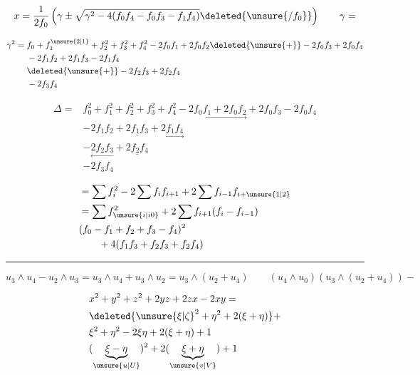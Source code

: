 \[
x=\frac{1}{2f_0}\left(\gamma\pm\sqrt{\gamma^2-4(f_0f_4-f_0f_3-f_1f_4)}\deleted{\unsure{/f_0}}\right)
\qquad \gamma=
\]

\[
\begin{aligned}
\gamma^2={}&f_0+f_1^{\unsure{2|1}}+f_2^2+f_3^2+f_4^2-2f_0f_1+2f_0f_2
\deleted{\unsure{+}}-2f_0f_3+2f_0f_4\\
&-2f_1f_2+2f_1f_3-2f_1f_4\\
&\deleted{\unsure{+}}-2f_2f_3+2f_2f_4\\
&-2f_3f_4
\end{aligned}
\]

\[
\begin{aligned}
\Delta={}&f_0^2+f_1^2+f_2^2+f_3^2+f_4^2-\underset{\longrightarrow}{\boxed{2f_0f_1}+\boxed{2f_0f_2}}+\boxed{2f_0f_3}-\boxed{2f_0f_4}\\
&-\boxed{2f_1f_2}+\underline{\boxed{2f_1f_3}}+2\underset{\longrightarrow}{\boxed{f_1f_4}}\\
&-\underset{\longleftarrow}{\boxed{2f_2f_3}}+\underline{\boxed{2f_2f_4}}\\
&-\boxed{2f_3f_4}
\end{aligned}
\]

\[
\begin{aligned}
&=\sum f_i^2-2\sum f_i f_{i+1}+2\sum f_{i-1}f_{i+\unsure{1|2}}\\
&=\sum f_{\unsure{i|i0}}^2+2\sum f_{i+1}(f_i-f_{i-1})\\
&(f_0-f_1+f_2+f_3-f_4)^2\\
&\qquad+4(f_1f_3+f_2f_3+f_2f_4)
\end{aligned}
\]

\noindent\rule{\linewidth}{.3pt}
{\small
\[
u_3\wedge u_4-u_2\wedge u_3=u_3\wedge u_4+u_3\wedge u_2=u_3\wedge(u_2+u_4)
\qquad (u_4\wedge u_0)(u_3\wedge(u_2+u_4))-
\]
}


\[
\begin{aligned}
&x^2+y^2+z^2+2yz+2zx-2xy=\\
&\deleted{{\unsure{\xi|\zeta}}^2+\eta^2+2(\xi+\eta)}+\\
&\xi^2+\eta^2-2\xi\eta+2(\xi+\eta)+1\\
&(\underbrace{\xi-\eta}_{\unsure{u|U}})^2+2(\underbrace{\xi+\eta}_{\unsure{v|V}})+1
\end{aligned}
\]

